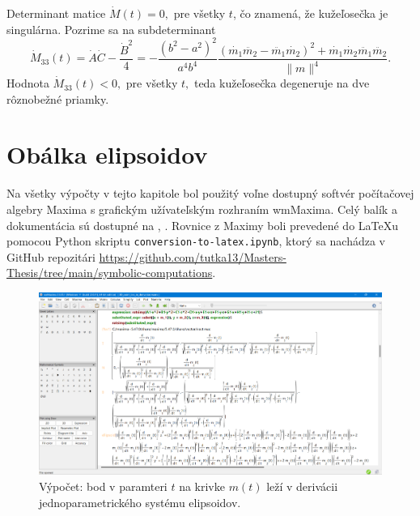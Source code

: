 Determinant matice $\dot{M}(t) = 0, $ pre všetky $t$, čo znamená, že kužeľosečka je singulárna.
Pozrime sa na subdeterminant
$$
\dot{M}_{33}(t) = \dot{A} \dot{C} - \frac{\dot{B}^2}{4} =  -\frac{(b^2 - a^2)^2}{a^4b^4} \frac{ (\dot{m_1}\ddot{m_2} - \ddot{m_1}\dot{m_2})^2 + \dot{m_1}\dot{m_2}\ddot{m_1}\ddot{m_2}}{\|m\|^4}.
$$ 
Hodnota $\dot{M}_33(t) < 0, $ pre všetky $t,$ teda kužeľosečka degeneruje na dve rôznobežné priamky.

\section{Obálka elipsoidov}

Na všetky výpočty v tejto kapitole bol použitý voľne dostupný softvér počítačovej algebry Maxima s grafickým užívateľským rozhraním wmMaxima. Celý balík a dokumentácia sú dostupné na \cite{MaximaDoc}, \cite{MaximaDownload}. Rovnice z Maximy boli prevedené do \LaTeX u pomocou Python skriptu \verb|conversion-to-latex.ipynb|, ktorý sa nachádza v GitHub repozitári \url{https://github.com/tutka13/Masters-Thesis/tree/main/symbolic-computations}.

\begin{figure}[h!]
	\centering
	\includegraphics[width=\textwidth]{images/maxima.png}
	\caption[Softvér Maxima.]{Výpočet: bod v paramteri $t$ na krivke $m(t)$ leží v derivácii jednoparametrického systému elipsoidov.}
	\label{fig:3D_point_lies}
\end{figure}

